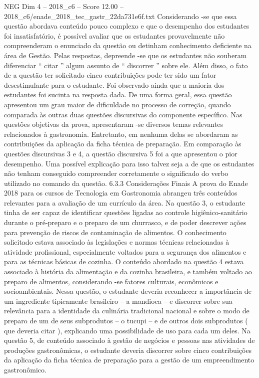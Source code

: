 \begin{textsample}{NEG Dim 4 – 2018\_c6 – Score 12.00 – 2018\_c6/enade\_2018\_tec\_gastr\_22da731e6f.txt}
Considerando -se que essa questão abordava conteúdo pouco complexo e que o desempenho dos estudantes foi insatisfatório, é possível avaliar que os estudantes provavelmente não compreenderam o enunciado da questão ou detinham conhecimento deficiente na área de Gestão.
Pelas respostas, depreende -se que os estudantes não souberam diferenciar “ citar ” algum assunto de “ discorrer ” sobre ele.
Além disso, o fato de a questão ter solicitado cinco contribuições pode ter sido um fator desestimulante para o estudante.
Foi observado ainda que a maioria dos estudantes foi sucinta na resposta dada.
De uma forma geral, essa questão apresentou um grau maior de dificuldade no processo de correção, quando comparada às outras duas questões discursivas do componente específico.
Nas questões objetivas da prova, apresentaram -se diversos temas relevantes relacionados à gastronomia.
Entretanto, em nenhuma delas se abordaram as contribuições da aplicação da ficha técnica de preparação.
Em comparação às questões discursivas 3 e 4, a questão discursiva 5 foi a que apresentou o pior desempenho.
Uma possível explicação para isso talvez seja a de que os estudantes não tenham conseguido compreender corretamente o significado do verbo utilizado no comando da questão. 6.3.3 Considerações Finais A prova do Enade 2018 para os cursos de Tecnologia em Gastronomia abrangeu três conteúdos relevantes para a avaliação de um currículo da área.
Na questão 3, o estudante tinha de ser capaz de identificar questões ligadas ao controle higiênico-sanitário durante o pré-preparo e o preparo de um churrasco, e de poder descrever ações para prevenção de riscos de contaminação de alimentos.
O conhecimento solicitado estava associado às legislações e normas técnicas relacionadas à atividade profissional, especialmente voltados para a segurança dos alimentos e para as técnicas básicas de cozinha.
O conteúdo abordado na questão 4 estava associado à história da alimentação e da cozinha brasileira, e também voltado ao preparo de alimentos, considerando -se fatores culturais, econômicos e socioambientais.
Nessa questão, o estudante deveria reconhecer a importância de um ingrediente tipicamente brasileiro – a mandioca – e discorrer sobre sua relevância para a identidade da culinária tradicional nacional e sobre o modo de preparo de um de seus subprodutos – o tucupi – e de outros dois subprodutos ( que deveria citar ), explicando uma possibilidade de uso para cada um deles.
Na questão 5, de conteúdo associado à gestão de negócios e pessoas nas atividades de produções gastronômicas, o estudante deveria discorrer sobre cinco contribuições da aplicação da ficha técnica de preparação para a gestão de um empreendimento gastronômico.

\end{textsample}
